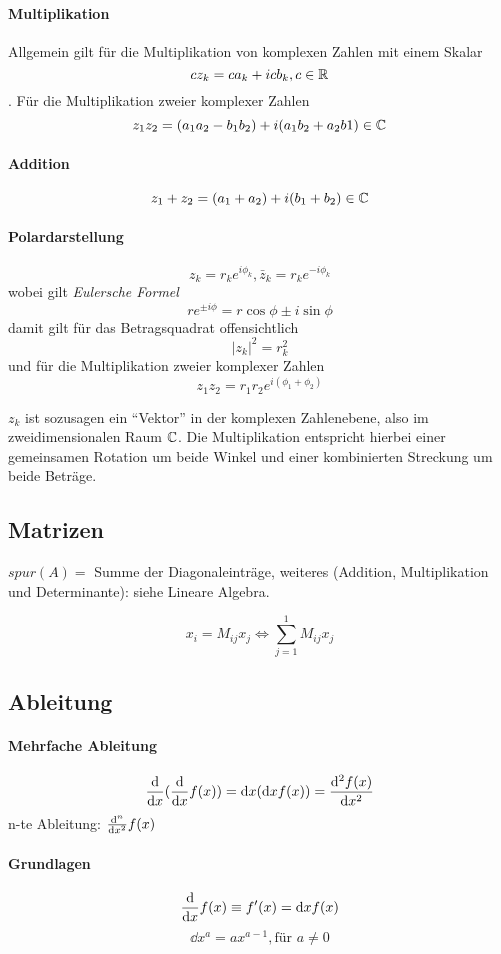 \paragraph{Multiplikation} Allgemein gilt für die Multiplikation von komplexen Zahlen mit einem Skalar $$c z_k = c a_k + i c b_k, c \in \mathbb R$$. Für die Multiplikation zweier komplexer Zahlen $$z_1 z_2 = (a_1 a_2-b_1b_2) + i(a_1b_2+a_2b1) \in \mathbb C$$
\paragraph{Addition} $$z_1 + z_2 = (a_1 + a_2) + i(b_1 + b_2) \in \mathbb C$$

\paragraph{Polardarstellung}
$$z_k = r_k e^{i \phi_k}, \bar z_k = r_k e^{-i\phi_k}$$
wobei gilt \textit{Eulersche Formel}
$$r e^{\pm i \phi} = r \cos\phi \pm i \sin\phi$$
damit gilt für das Betragsquadrat offensichtlich
$$|z_k|^2 = r_k^2$$
und für die Multiplikation zweier komplexer Zahlen
$$z_1 z_2 = r_1 r_2 e^{i (\phi_1 + \phi_2)}$$

$z_k$ ist sozusagen ein "`Vektor"' in der komplexen Zahlenebene, also im zweidimensionalen Raum $\mathbb C$. Die Multiplikation entspricht hierbei einer gemeinsamen Rotation um beide Winkel und einer kombinierten Streckung um beide Beträge.  

\subsection{Matrizen}
$spur(A) = $ Summe der Diagonaleinträge, weiteres (Addition, Multiplikation und Determinante): siehe Lineare Algebra.

$$x_i = M_{ij} x_j \Leftrightarrow \sum_{j=1}^1 M_{ij} x_j$$

\subsection{Ableitung}

\paragraph{Mehrfache Ableitung}
$$\frac{\mathrm d}{\mathrm d x} (\frac{\mathrm d}{\mathrm d x} f(x)) = \mathrm d x (\mathrm d x f(x)) = \frac{\mathrm d^2 f(x)}{\mathrm d x^2}$$
n-te Ableitung: $\frac{\mathrm d^n}{\mathrm d x^2} f(x)$

\paragraph{Grundlagen}
$$\frac{\mathrm d}{\mathrm d x} f(x) \equiv f'(x) = \mathrm d x f(x)$$
$$\dd x^a = a x^{a-1}, \text{für $a \neq 0$}$$

